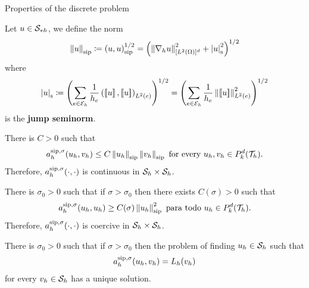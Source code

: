 \begin{frame}[allowframebreaks]{Properties of the discrete problem}

\begin{definicion}
	Let $u\in\S_{*h}$, we define the norm
	\begin{equation*}
	\norma{u}_{\text{sip}}\coloneqq\escalarsip{u}{u}^{1/2}=\left(\norma{\nabla_h u}^2_{[L^2(\Omega)]^d}+\left|u\right|^2_{\text{s}}\right)^{1/2}
	\end{equation*}
	where
	\begin{equation*}
	\left|u\right|_{\text{s}}\coloneqq \left(\sum_{e\in\E_h}\frac{1}{h_e}\escalar{\salto{u}}{\salto{u}}_{L^2(e)}\right)^{1/2}=\left(\sum_{e\in\E_h}\frac{1}{h_e}\norma{\salto{u}}^2_{L^2(e)}\right)^{1/2}
	\end{equation*}
	is the \textbf{jump seminorm}.
\end{definicion}
\framebreak
{\small
\begin{lemma}
	There is $C>0$ such that $$\asip{u_h}{v_h}\leq C\norma{u_h}_{\text{sip}}\normasip{v_h}\text{ for every }u_h,v_h\in\mathbb{P}_k^d(\T_h).$$ Therefore, $\asip{\cdot}{\cdot}$ is continuous in $\S_h\times\S_h$.
\end{lemma}

\begin{lemma}
	\label{lemma:eliptico_coercitividad}
	There is $\sigma_0>0$ such that if $\sigma>\sigma_0$ then there exists $C(\sigma)>0$ such that $$\asip{u_h}{u_h}\geq C(\sigma)\norma{u_h}_{\text{sip}}^2\text{ para todo }u_h\in\mathbb{P}_k^d(\T_h).$$ Therefore, $\asip{\cdot}{\cdot}$ is coercive in $\S_h\times\S_h$.
\end{lemma}
}
\framebreak
\begin{lemma}
	\label{lemma:buen_planteamiento_form_var_DG_elpitica}
	There is $\sigma_0>0$ such that if $\sigma>\sigma_0$ then the problem of finding $u_h\in\S_h$ such that $$\asip{u_h}{v_h}=L_h(v_h)$$ for every $v_h\in\S_h$ has a unique solution.
\end{lemma}

\end{frame}

